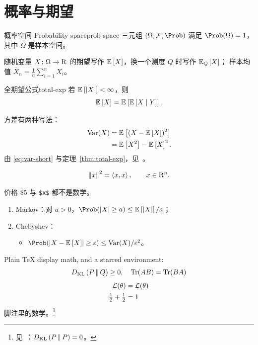 \chapter{概率与期望}\label{chap:prob}

\begin{definition}{概率空间 Probability space}{prob-space}
  三元组 $(\Omega, \mathcal{F}, \Prob)$ 满足 $\Prob(\Omega) = 1$，其中 $\Omega$ 是样本空间。
\end{definition}

随机变量 $X\colon \Omega \to \R$ 的期望写作 $\E{X}$，换一个测度 $Q$ 时写作 $\E[Q]{X}$；
样本均值 \(\bar X_n = \frac{1}{n}\sum_{i=1}^n X_i\)。

\begin{theorem}{全期望公式}{total-exp}
  若 $\E{\abs{X}} < \infty$，则
  \begin{equation}\label{eq:total-exp}
    \E{X} = \E{\E{X \mid Y}}.
  \end{equation}
\end{theorem}

方差有两种写法：
\begin{align}
  \Var(X) &= \E{(X - \E{X})^2} \label{eq:var-def} \\
          &= \E{X^2} - \E{X}^2. \label{eq:var-short}
\end{align}
由 \eqref{eq:var-short} 与定理~\ref{thm:total-exp}，见~\cite[第 2 章]{zhang2020notes}。

\[
  \norm{x}^2 = \inner{x}{x}, \qquad x \in \R^n.
\]

价格 \$5 与 \verb|$x$| 都不是数学。

\begin{enumerate}
  \item Markov：对 $a > 0$，$\Prob(\abs{X} \ge a) \le \E{\abs{X}} / a$；
  \item Chebyshev：
    \begin{itemize}
      \item $\Prob(\abs{X - \E{X}} \ge \eps) \le \Var(X) / \eps^2$。
    \end{itemize}
\end{enumerate}

Plain \TeX{} display math, and a starred environment:
$$
  \KL{P}{Q} \ge 0, \quad \Tr(AB) = \Tr(BA)
$$
\begin{align*}
  \loss &= \loss[\theta] \\
  \half + \half &= 1
\end{align*}
脚注里的数学。\footnote{见~\cite{li2019lln}：$\KL{P}{P} = 0$。}
